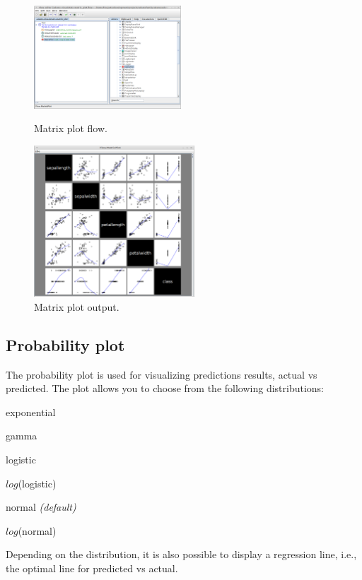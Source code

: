 \documentclass[a4paper]{book}
\begin{document}
\begin{figure}[ht]
  \begin{minipage}[t]{0.5\linewidth}
    \centering
    \includegraphics[width=5.5cm]{images/matrixplot-flow.png}
    \caption{Matrix plot flow.}
    \label{matrixplot-flow}
  \end{minipage}
  \hspace{0.5cm}
  \begin{minipage}[t]{0.5\linewidth}
    \centering
    \includegraphics[width=6.0cm]{images/matrixplot-output.png}
    \caption{Matrix plot output.}
    \label{matrixplot-output}
  \end{minipage}
\end{figure}

\clearpage
\subsection{Probability plot}
The probability plot is used for visualizing predictions results, actual vs 
predicted. The plot allows you to choose from the following distributions:
\begin{tight_itemize}
	\item exponential
	\item gamma
	\item logistic
	\item $log$(logistic)
	\item normal \textit{(default)} \cite{normalprobplot}
	\item $log$(normal)
\end{tight_itemize}
Depending on the distribution, it is also possible to display a regression line,
i.e., the optimal line for predicted vs actual.
\end{document}
